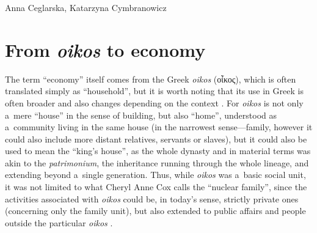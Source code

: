 \begin{artengenv2auth}{Anna Ceglarska, Katarzyna Cymbranowicz}
\section{From \textit{oikos} to economy}

The term ``economy'' itself comes from the Greek \textit{oikos} (\textgreek{οἶκος}),
 which is often translated simply as ``household'', but it is worth noting that its use in Greek is often broader and also changes depending on the context 
\parencite[][p.2]{roy_polis_1999}. %
 For \textit{oikos} is not only a~mere ``house'' in the sense of building, but also ``home'', understood as a~community living in the same house (in the narrowest sense---family, however it could also include more distant relatives, servants or slaves), but it could also be used to mean the ``king's house'', as the whole dynasty 
\parencite[][V.31, VI.9]{herodotus_histories_1920} %
 and in material terms was akin to the \textit{patrimonium}, the inheritance running through the whole lineage, and extending beyond a~single generation. Thus, while \textit{oikos} was a~basic social unit, it was not limited to what Cheryl Anne Cox 
\parencite*[][]{cox_household_1998} %
 calls the ``nuclear family'', since the activities associated with \textit{oikos} could be, in today's sense, strictly private ones (concerning only the family unit), but also extended to public affairs and people outside the particular \textit{oikos} 
\parencite[][]{martin_urban_2016}.%





\end{artengenv2auth}

